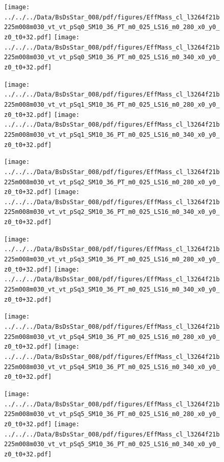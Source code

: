 \documentclass[a4paper,10pt]{article}
\begin{document}
\begin{figure}[p]
 \texttt{[image: ../../../Data/BsDsStar\_008/pdf/figures/EffMass\_cl\_l3264f21b225m008m030\_vt\_vt\_pSq0\_SM10\_36\_PT\_m0\_025\_LS16\_m0\_280\_x0\_y0\_z0\_t0+32.pdf]} 
 \texttt{[image: ../../../Data/BsDsStar\_008/pdf/figures/EffMass\_cl\_l3264f21b225m008m030\_vt\_vt\_pSq0\_SM10\_36\_PT\_m0\_025\_LS16\_m0\_340\_x0\_y0\_z0\_t0+32.pdf]} 
 \end{figure}
\begin{figure}[p]
 \texttt{[image: ../../../Data/BsDsStar\_008/pdf/figures/EffMass\_cl\_l3264f21b225m008m030\_vt\_vt\_pSq1\_SM10\_36\_PT\_m0\_025\_LS16\_m0\_280\_x0\_y0\_z0\_t0+32.pdf]} 
 \texttt{[image: ../../../Data/BsDsStar\_008/pdf/figures/EffMass\_cl\_l3264f21b225m008m030\_vt\_vt\_pSq1\_SM10\_36\_PT\_m0\_025\_LS16\_m0\_340\_x0\_y0\_z0\_t0+32.pdf]} 
 \end{figure}
\begin{figure}[p]
 \texttt{[image: ../../../Data/BsDsStar\_008/pdf/figures/EffMass\_cl\_l3264f21b225m008m030\_vt\_vt\_pSq2\_SM10\_36\_PT\_m0\_025\_LS16\_m0\_280\_x0\_y0\_z0\_t0+32.pdf]} 
 \texttt{[image: ../../../Data/BsDsStar\_008/pdf/figures/EffMass\_cl\_l3264f21b225m008m030\_vt\_vt\_pSq2\_SM10\_36\_PT\_m0\_025\_LS16\_m0\_340\_x0\_y0\_z0\_t0+32.pdf]} 
 \end{figure}
\clearpage
\begin{figure}[p]
 \texttt{[image: ../../../Data/BsDsStar\_008/pdf/figures/EffMass\_cl\_l3264f21b225m008m030\_vt\_vt\_pSq3\_SM10\_36\_PT\_m0\_025\_LS16\_m0\_280\_x0\_y0\_z0\_t0+32.pdf]} 
 \texttt{[image: ../../../Data/BsDsStar\_008/pdf/figures/EffMass\_cl\_l3264f21b225m008m030\_vt\_vt\_pSq3\_SM10\_36\_PT\_m0\_025\_LS16\_m0\_340\_x0\_y0\_z0\_t0+32.pdf]} 
 \end{figure}
\begin{figure}[p]
 \texttt{[image: ../../../Data/BsDsStar\_008/pdf/figures/EffMass\_cl\_l3264f21b225m008m030\_vt\_vt\_pSq4\_SM10\_36\_PT\_m0\_025\_LS16\_m0\_280\_x0\_y0\_z0\_t0+32.pdf]} 
 \texttt{[image: ../../../Data/BsDsStar\_008/pdf/figures/EffMass\_cl\_l3264f21b225m008m030\_vt\_vt\_pSq4\_SM10\_36\_PT\_m0\_025\_LS16\_m0\_340\_x0\_y0\_z0\_t0+32.pdf]} 
 \end{figure}
\begin{figure}[p]
 \texttt{[image: ../../../Data/BsDsStar\_008/pdf/figures/EffMass\_cl\_l3264f21b225m008m030\_vt\_vt\_pSq5\_SM10\_36\_PT\_m0\_025\_LS16\_m0\_280\_x0\_y0\_z0\_t0+32.pdf]} 
 \texttt{[image: ../../../Data/BsDsStar\_008/pdf/figures/EffMass\_cl\_l3264f21b225m008m030\_vt\_vt\_pSq5\_SM10\_36\_PT\_m0\_025\_LS16\_m0\_340\_x0\_y0\_z0\_t0+32.pdf]} 
 \end{figure}
\clearpage
\clearpage
\end{document}
